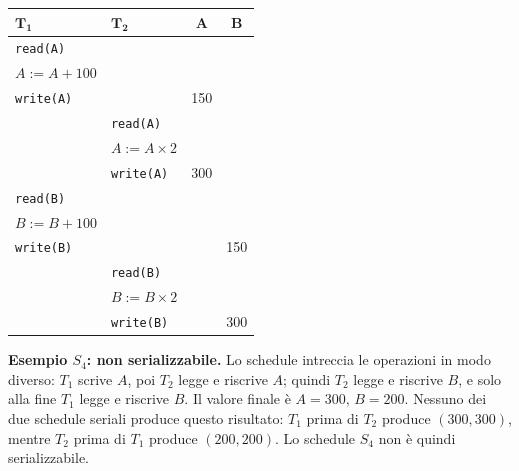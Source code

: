 \documentclass[12pt]{extarticle}
\begin{document}
\begin{center}
\small
\begin{tabular}{@{}llcc@{}}
    \toprule
    $\boldsymbol{T_1}$ & $\boldsymbol{T_2}$ & $\boldsymbol{A}$ & $\boldsymbol{B}$ \\
    \midrule
    \texttt{read(A)}       &      &      &      \\
    $A := A + 100$         &      &      &      \\
    \texttt{write(A)}      &      & 150  &      \\
     & \texttt{read(A)}       &      &      \\
     & $A := A \times 2$      &      &      \\
     & \texttt{write(A)}      & 300  &      \\
    \texttt{read(B)}       &      &      &      \\
    $B := B + 100$         &      &      &      \\
    \texttt{write(B)}      &      &      & 150  \\
     & \texttt{read(B)}       &      &      \\
     & $B := B \times 2$      &      &      \\
     & \texttt{write(B)}      &      & 300  \\
    \bottomrule
\end{tabular}
\end{center}

\medskip
\noindent \textbf{Esempio $S_4$: non serializzabile.} Lo schedule intreccia le operazioni in modo diverso: $T_1$ scrive $A$, poi $T_2$ legge e riscrive $A$; quindi $T_2$ legge e riscrive $B$, e solo alla fine $T_1$ legge e riscrive $B$. Il valore finale è $A=300$, $B=200$. Nessuno dei due schedule seriali produce questo risultato: $T_1$ prima di $T_2$ produce $(300,300)$, mentre $T_2$ prima di $T_1$ produce $(200,200)$. Lo schedule $S_4$ non è quindi serializzabile.
\end{document}
